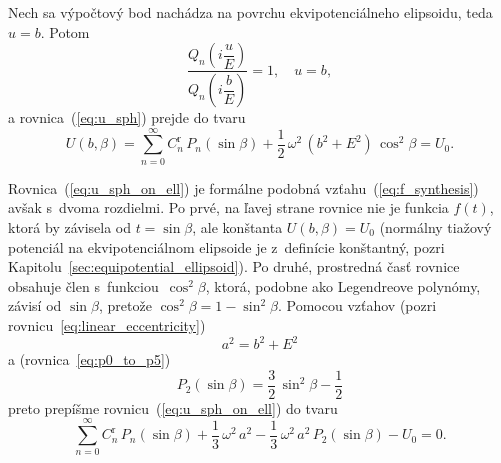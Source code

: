 \documentclass[a4paper,12pt]{book}
\begin{document}
Nech sa výpočtový bod nachádza na povrchu ekvipotenciálneho elipsoidu, teda $u 
= b$.  Potom
%
\begin{equation}
\frac{Q_n\left( i \dfrac{u}{E} \right)}{Q_n\left( i \dfrac{b}{E} \right)} 
= 1{,} \quad u = b{,}
\end{equation}
%
a rovnica~(\ref{eq:u_sph}) prejde do tvaru
%
\begin{equation}
\label{eq:u_sph_on_ell}
U(b, \beta) = \sum_{n = 0}^\infty C^{\mathrm{r}}_n \, P_n(\sin\beta) 
+ \frac{1}{2} \, \omega^2 \, (b^2 + E^2) \, \cos^2\beta = U_0{.}
\end{equation}

Rovnica~(\ref{eq:u_sph_on_ell}) je formálne podobná 
vzťahu~(\ref{eq:f_synthesis}) avšak s~dvoma rozdielmi.  Po prvé, na ľavej 
strane rovnice nie je funkcia $f(t)$, ktorá by závisela od $t = \sin\beta$, ale 
konštanta $U(b, \beta) = U_0$ (normálny tiažový potenciál na ekvipotenciálnom 
elipsoide je z~definície konštantný, pozri 
Kapitolu~\ref{sec:equipotential_ellipsoid}).  Po druhé, prostredná časť rovnice 
obsahuje člen s~funkciou~$\cos^2\beta$, ktorá, podobne ako Legendreove 
polynómy, závisí od $\sin\beta$, pretože $\cos^2\beta = 1 - \sin^2\beta$.  
Pomocou vzťahov (pozri rovnicu~\ref{eq:linear_eccentricity})
%
\begin{equation}
a^2 = b^2 + E^2
\end{equation}
%
a (rovnica~\ref{eq:p0_to_p5})
%
\begin{equation}
P_2(\sin\beta) = \frac{3}{2} \, \sin^2\beta - \frac{1}{2}
\end{equation}
%
preto prepíšme rovnicu~(\ref{eq:u_sph_on_ell}) do tvaru
%
\begin{equation}
\label{eq:cnr}
\sum_{n = 0}^\infty C^{\mathrm{r}}_n \, P_n(\sin\beta) + \frac{1}{3} \, 
\omega^2 \, a^2  - \frac{1}{3} \, \omega^2 \, a^2 \, P_2(\sin\beta) - U_0 
= 0{.}
\end{equation}
\end{document}
